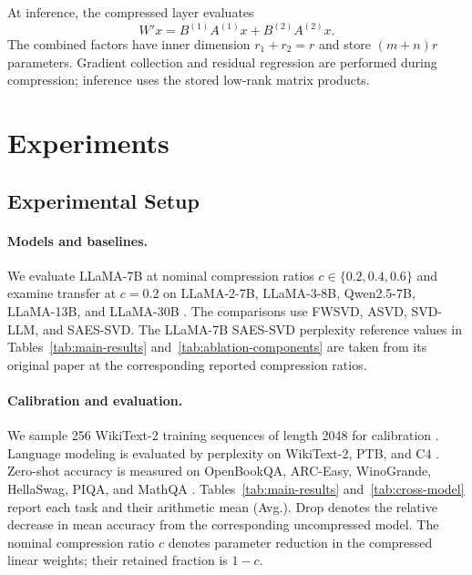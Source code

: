 \documentclass[11pt]{article}
\begin{document}
At inference, the compressed layer evaluates
\begin{equation}
W'x=B^{(1)}A^{(1)}x+B^{(2)}A^{(2)}x.
\label{eq:deployment}
\end{equation}
The combined factors have inner dimension $r_1+r_2=r$ and store $(m+n)r$ parameters. Gradient collection and residual regression are performed during compression; inference uses the stored low-rank matrix products.

\section{Experiments}\label{sec:experiments}



\subsection{Experimental Setup}

\paragraph{Models and baselines.}
We evaluate LLaMA-7B at nominal compression ratios $c\in\{0.2,0.4,0.6\}$ and examine transfer at $c=0.2$ on LLaMA-2-7B, LLaMA-3-8B, Qwen2.5-7B, LLaMA-13B, and LLaMA-30B \citep{touvron2023llama,touvron2023llama2,dubey2024llama3,yang2024qwen25}. The comparisons use FWSVD, ASVD, SVD-LLM, and SAES-SVD. The LLaMA-7B SAES-SVD perplexity reference values in Tables~\ref{tab:main-results} and~\ref{tab:ablation-components} are taken from its original paper at the corresponding reported compression ratios.

\paragraph{Calibration and evaluation.}
We sample 256 WikiText-2 training sequences of length 2048 for calibration \citep{merity2017wikitext2}. Language modeling is evaluated by perplexity on WikiText-2, PTB, and C4 \citep{marcus1993ptb,raffel2020c4}. Zero-shot accuracy is measured on OpenBookQA, ARC-Easy, WinoGrande, HellaSwag, PIQA, and MathQA \citep{mihaylov2018openbook,clark2018think,sakaguchi2021winogrande,zellers2019hellaswag,bisk2020piqa,amini2019mathqa}. Tables~\ref{tab:main-results} and~\ref{tab:cross-model} report each task and their arithmetic mean (Avg.). Drop denotes the relative decrease in mean accuracy from the corresponding uncompressed model. The nominal compression ratio $c$ denotes parameter reduction in the compressed linear weights; their retained fraction is $1-c$.
\end{document}
